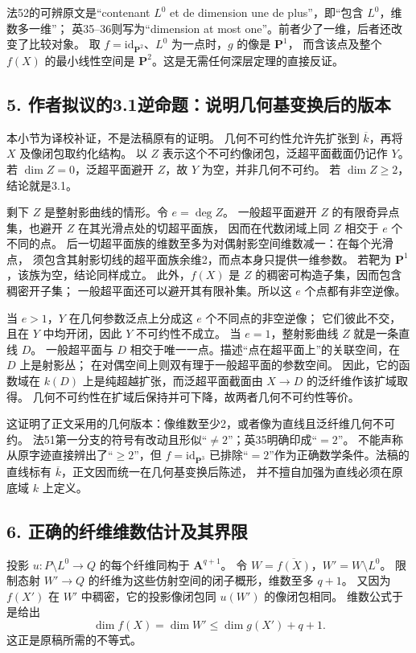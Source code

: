 法52的可辨原文是“contenant $L^0$ et de dimension une de plus”，即“包含 $L^0$，维数多一维”；
英35--36则写为“dimension at most one”。前者少了一维，后者还改变了比较对象。
取 $f=\mathrm{id}_{\mathbf P^2}$、$L^0$ 为一点时，$g$ 的像是 $\mathbf P^1$，
而含该点及整个 $f(X)$ 的最小线性空间是 $\mathbf P^2$。这是无需任何深层定理的直接反证。

\subsection*{5. 作者拟议的3.1逆命题：说明几何基变换后的版本}

本小节为译校补证，不是法稿原有的证明。
几何不可约性允许先扩张到 $\overline k$，再将 $X$ 及像闭包取约化结构。
以 $Z$ 表示这个不可约像闭包，泛超平面截面仍记作 $Y$。
若 $\dim Z=0$，泛超平面避开 $Z$，故 $Y$ 为空，并非几何不可约。
若 $\dim Z\ge2$，结论就是3.1。

剩下 $Z$ 是整射影曲线的情形。令 $e=\deg Z$。
一般超平面避开 $Z$ 的有限奇异点集，也避开 $Z$ 在其光滑点处的切超平面族，
因而在代数闭域上同 $Z$ 相交于 $e$ 个不同的点。
后一切超平面族的维数至多为对偶射影空间维数减一：在每个光滑点，
须包含其射影切线的超平面族余维2，而点本身只提供一维参数。
若靶为 $\mathbf P^1$，该族为空，结论同样成立。
此外，$f(X)$ 是 $Z$ 的稠密可构造子集，因而包含稠密开子集；
一般超平面还可以避开其有限补集。所以这 $e$ 个点都有非空逆像。

当 $e>1$，$Y$ 在几何参数泛点上分成这 $e$ 个不同点的非空逆像；
它们彼此不交，且在 $Y$ 中均开闭，因此 $Y$ 不可约性不成立。
当 $e=1$，整射影曲线 $Z$ 就是一条直线 $D$。
一般超平面与 $D$ 相交于唯一一点。描述“点在超平面上”的关联空间，在 $D$ 上是射影丛；
在对偶空间上则双有理于一般超平面的参数空间。
因此，它的函数域在 $k(D)$ 上是纯超越扩张，而泛超平面截面由 $X\to D$ 的泛纤维作该扩域取得。
几何不可约性在扩域后保持并可下降，故两者几何不可约性等价。

这证明了正文采用的几何版本：像维数至少2，或者像为直线且泛纤维几何不可约。
法51第一分支的符号有改动且形似“$\ne2$”；英35明确印成“$=2$”。
不能声称从原字迹直接辨出了“$\ge2$”，但 $f=\mathrm{id}_{\mathbf P^3}$
已排除“$=2$”作为正确数学条件。法稿的直线标有 $\overline k$，正文因而统一在几何基变换后陈述，
并不擅自加强为直线必须在原底域 $k$ 上定义。

\subsection*{6. 正确的纤维维数估计及其界限}

投影 $u:P\setminus L^0\to Q$ 的每个纤维同构于 $\mathbf A^{q+1}$。
令 $W=\overline{f(X)}$，$W'=W\setminus L^0$。
限制态射 $W'\to Q$ 的纤维为这些仿射空间的闭子概形，维数至多 $q+1$。
又因为 $f(X')$ 在 $W'$ 中稠密，它的投影像闭包同 $u(W')$ 的像闭包相同。
维数公式于是给出
\[
 \dim f(X)=\dim W'\leq\dim g(X')+q+1.
\]
这正是原稿所需的不等式。

